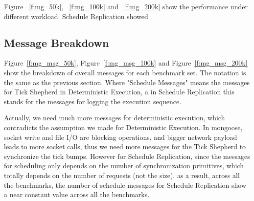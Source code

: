 Figure ~\ref{f:mg_50k}, ~\ref{f:mg_100k} and ~\ref{f:mg_200k} show the performance under different workload. Schedule Replication showed

\subsection{Message Breakdown}
Figure~\ref{f:mg_msg_50k}, Figure~\ref{f:mg_msg_100k} and Figure~\ref{f:mg_msg_200k} show the breakdown of overall messages for each benchmark set. The notation is the same as the previous section. Where "Schedule Messages" means the messages for Tick Shepherd in Deterministic Execution, a in Schedule Replication this stands for the messages for logging the execution sequence.

Actually, we need much more messages for deterministic execution, which contradicts the assumption we made for Deterministic Execution. In mongoose, socket write and file I/O are blocking operations, and bigger network payload leads to more socket calls, thus we need more messages for the Tick Shepherd to synchronize the tick bumps. However for Schedule Replication, since the messages for scheduling only depends on the number of synchronization primitives, which totally depends on the number of requests (not the size), as a result, across all the benchmarks, the number of schedule messages for Schedule Replication show a near constant value across all the benchmarks.

